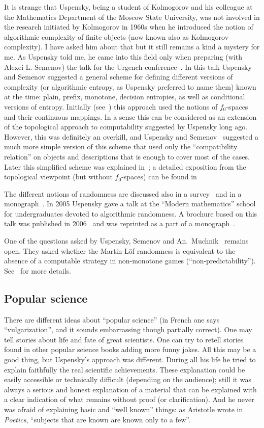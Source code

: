 \documentclass[12pt]{article}
\theoremstyle{remark}
\begin{document}
It is strange that Uspensky, being a student of Kolmogorov and his colleague at the Mathematics Department of the Moscow State University, was not involved in the research initiated by Kolmogorov in 1960s when he introduced the notion of algorithmic complexity of finite objects (now known also as Kolmogorov complexity). I have asked him about that but it still remains a kind a mystery for me. As Uspensky told me, he came into this field only when preparing (with Alexei L. Semenov) the talk for the Urgench conference~\cite{1981,1982a}. In this talk Uspensky and Semenov suggested a general scheme for defining different versions of complexity (or algorithmic entropy, as Uspensky preferred to name them) known at the time: plain, prefix, monotone, decision entropies, as well as conditional versions of entropy. Initially (see~\cite{Shen1984}) this approach used the notions of $f_0$-spaces and their continuous mappings. In a sense this can be considered as an extension of the topological approach to computability suggested by Uspensky long ago.  However, this was definitely an overkill, and Uspensky and Semenov~\cite{1981,1982a} suggested a much more simple version of this scheme that used only the ``compatibility relation'' on objects and descriptions that is enough to cover most of the cases. Later this simplified scheme was explained in~\cite{1992a,1996}; a detailed exposition from the topological viewpoint (but without $f_0$-spaces) can be found in~\cite{2013}

The different notions of randomness are discussed also in a survey~\cite{1990} and in a monograph~\cite{2013}. In 2005 Uspensky gave a talk at the ``Modern mathematics'' school for undergraduates devoted to algorithmic randomness. A brochure based on this talk was published in 2006~\cite{2005} and was reprinted as a part of a monograph~\cite{2013}.

One of the questions asked by Uspensky, Semenov and An.~Muchnik~\cite{1998} remains open. They asked whether the Martin-L\"{of} randomness is equivalent to the absence of a computable strategy in non-monotone games (``non-predictability''). See~\cite{2006,2013} for more details.

\subsection*{Popular science}

There are different ideas about ``popular science'' (in French one says ``vulgarization'', and it sounds embarrassing though partially correct). One may tell stories about life and fate of great scientists. One can try to retell stories found in other popular science books adding more funny jokes. All this may be a good thing, but Uspensky's approach was different. During all his life he tried to explain faithfully the real scientific achievements. These explanation could be easily accessible or technically difficult (depending on the audience); still it was always a serious and honest explanation of a material that can be explained with a clear indication of what remains without proof (or clarification). And he never was afraid of explaining basic and ``well known'' things: as Aristotle wrote in \emph{Poetics}, ``subjects that are known are known only to a few''.
\end{document}
